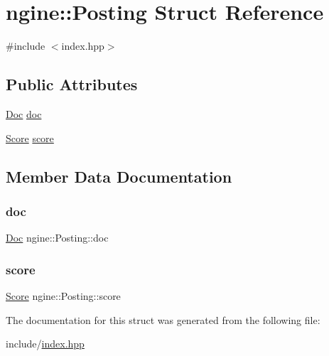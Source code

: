 \hypertarget{structngine_1_1Posting}{}\section{ngine\+:\+:Posting Struct Reference}
\label{structngine_1_1Posting}


{\ttfamily \#include $<$index.\+hpp$>$}

\subsection*{Public Attributes}
\begin{DoxyCompactItemize}
\item 
\hyperlink{structngine_1_1Doc}{Doc} \hyperlink{structngine_1_1Posting_a25b3785484774f499e8affb886db512d}{doc}
\item 
\hyperlink{structngine_1_1Score}{Score} \hyperlink{structngine_1_1Posting_ae4cd4096f0641f9428487a366ce03248}{score}
\end{DoxyCompactItemize}


\subsection{Member Data Documentation}
\mbox{\label{structngine_1_1Posting_a25b3785484774f499e8affb886db512d}} 
\subsubsection{\texorpdfstring{doc}{doc}}
{\footnotesize\ttfamily \hyperlink{structngine_1_1Doc}{Doc} ngine\+::\+Posting\+::doc}

\mbox{\label{structngine_1_1Posting_ae4cd4096f0641f9428487a366ce03248}} 
\subsubsection{\texorpdfstring{score}{score}}
{\footnotesize\ttfamily \hyperlink{structngine_1_1Score}{Score} ngine\+::\+Posting\+::score}



The documentation for this struct was generated from the following file\+:\begin{DoxyCompactItemize}
\item 
include/\hyperlink{index_8hpp}{index.\+hpp}\end{DoxyCompactItemize}
